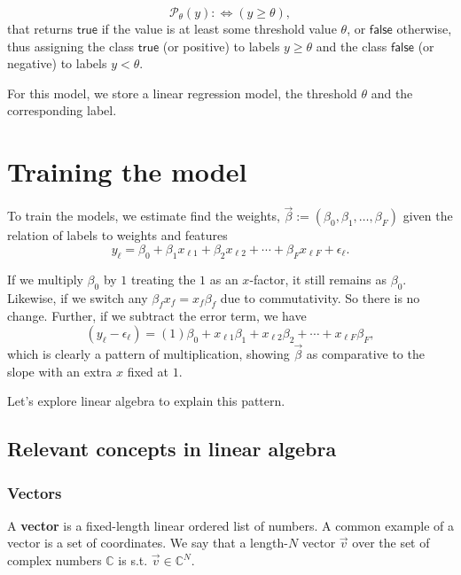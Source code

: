 \documentclass{article}
\begin{document}
\begin{equation}
    \mathcal{P}_\theta(y) :\Leftrightarrow (y \geq \theta),
\end{equation}
that returns $\mathsf{true}$ if the value is at least some threshold value $\theta$, or $\mathsf{false}$ otherwise, thus assigning the class $\mathsf{true}$ (or positive) to labels $y \geq \theta$ and the class $\mathsf{false}$ (or negative) to labels $y < \theta$.

For this model, we store a linear regression model, the threshold $\theta$ and the corresponding label.

\section{Training the model}

To train the models, we estimate find the weights, $\vec\beta := (\beta_0, \beta_1, \dots, \beta_F)$ given the relation of labels to weights and features
\begin{equation}
    y_\ell = \beta_0 + \beta_1x_{\ell1} + \beta_2x_{\ell2} + \cdots + \beta_F x_{\ell F} + \epsilon_\ell.
\end{equation}

If we multiply $\beta_0$ by $1$ treating the $1$ as an $x$-factor, it still remains as $\beta_0$. 
Likewise, if we switch any $\beta_f x_f = x_f \beta_f$ due to commutativity. 
So there is no change.
Further, if we subtract the error term, we have
\begin{equation}\label{eq:linear regression model, sum of x times beta}
    (y_\ell - \epsilon_\ell) = (1)\beta_0 + x_{\ell1}\beta_1 + x_{\ell2}\beta_2 + \cdots + x_{\ell F}\beta_F,
\end{equation}
which is clearly a pattern of multiplication, showing $\vec\beta$ as comparative to the slope with an extra $x$ fixed at $1$.

Let's explore linear algebra to explain this pattern.

\subsection{Relevant concepts in linear algebra}

\subsubsection{Vectors}
A \textbf{vector} is a fixed-length linear ordered list of numbers. A common example of a vector is a set of coordinates. We say that a length-$N$ vector $\vec{v}$ over the set of complex numbers $\mathbb{C}$ is s.t. $\vec{v} \in \mathbb{C}^N$.
\end{document}
